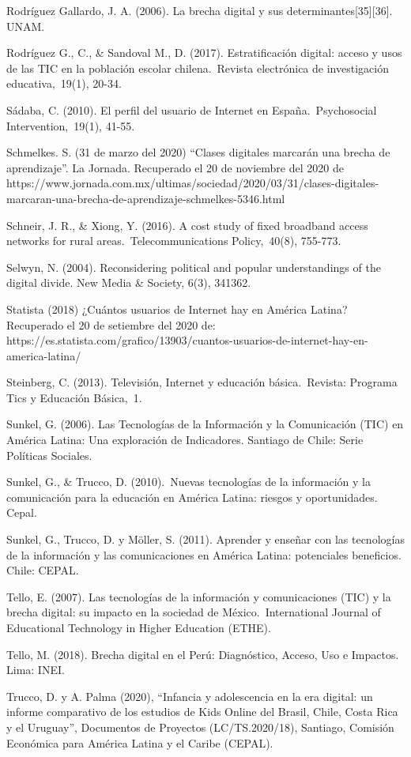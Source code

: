 Rodríguez Gallardo, J. A. (2006). La brecha digital y sus
determinantes{[}35{]}{[}36{]}. UNAM.

Rodríguez G., C., \& Sandoval M., D. (2017). Estratificación digital:
acceso y usos de las TIC en la población escolar chilena.~Revista
electrónica de investigación educativa,~19(1), 20-34.

Sádaba, C. (2010). El perfil del usuario de Internet en
España.~Psychosocial Intervention,~19(1), 41-55.

Schmelkes. S. (31 de marzo del 2020) ``Clases digitales marcarán una
brecha de aprendizaje''. La Jornada. Recuperado el 20 de noviembre del
2020 de
https://www.jornada.com.mx/ultimas/sociedad/2020/03/31/clases-digitales-marcaran-una-brecha-de-aprendizaje-schmelkes-5346.html

Schneir, J. R., \& Xiong, Y. (2016). A cost study of fixed broadband
access networks for rural areas.~Telecommunications Policy,~40(8),
755-773.

Selwyn, N. (2004). Reconsidering political and popular understandings of
the digital divide. New Media \& Society, 6(3), 341362.

Statista (2018) ¿Cuántos usuarios de Internet hay en América Latina?
Recuperado el 20 de setiembre del 2020 de:
https://es.statista.com/grafico/13903/cuantos-usuarios-de-internet-hay-en-america-latina/

Steinberg, C. (2013). Televisión, Internet y educación básica.~Revista:
Programa Tics y Educación Básica,~1.

Sunkel, G. (2006). Las Tecnologías de la Información y la Comunicación
(TIC) en América Latina: Una exploración de Indicadores. Santiago de
Chile: Serie Políticas Sociales.

Sunkel, G., \& Trucco, D. (2010).~Nuevas tecnologías de la información y
la comunicación para la educación en América Latina: riesgos y
oportunidades. Cepal.

Sunkel, G., Trucco, D. y Möller, S. (2011). Aprender y enseñar con las
tecnologías de la información y las comunicaciones en América Latina:
potenciales beneficios. Chile: CEPAL.

Tello, E. (2007). Las tecnologías de la información y comunicaciones
(TIC) y la brecha digital: su impacto en la sociedad de
México.~International Journal of Educational Technology in Higher
Education (ETHE).

Tello, M. (2018). Brecha digital en el Perú: Diagnóstico, Acceso, Uso e
Impactos. Lima: INEI.

Trucco, D. y A. Palma (2020), ``Infancia y adolescencia en la era
digital: un informe comparativo de los estudios de Kids Online del
Brasil, Chile, Costa Rica y el Uruguay'', Documentos de Proyectos
(LC/TS.2020/18), Santiago, Comisión Económica para América Latina y el
Caribe (CEPAL).

